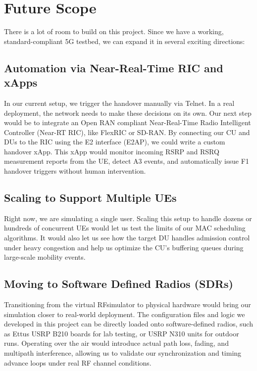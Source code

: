 \section{Future Scope}
\justify
There is a lot of room to build on this project. Since we have a working, standard-compliant 5G testbed, we can expand it in several exciting directions:

\subsection{Automation via Near-Real-Time RIC and xApps}
In our current setup, we trigger the handover manually via Telnet. In a real deployment, the network needs to make these decisions on its own. Our next step would be to integrate an Open RAN compliant Near-Real-Time Radio Intelligent Controller (Near-RT RIC), like FlexRIC or SD-RAN. By connecting our CU and DUs to the RIC using the E2 interface (E2AP), we could write a custom handover xApp. This xApp would monitor incoming RSRP and RSRQ measurement reports from the UE, detect A3 events, and automatically issue F1 handover triggers without human intervention.

\subsection{Scaling to Support Multiple UEs}
Right now, we are simulating a single user. Scaling this setup to handle dozens or hundreds of concurrent UEs would let us test the limits of our MAC scheduling algorithms. It would also let us see how the target DU handles admission control under heavy congestion and help us optimize the CU's buffering queues during large-scale mobility events.

\subsection{Moving to Software Defined Radios (SDRs)}
Transitioning from the virtual RFsimulator to physical hardware would bring our simulation closer to real-world deployment. The configuration files and logic we developed in this project can be directly loaded onto software-defined radios, such as Ettus USRP B210 boards for lab testing, or USRP N310 units for outdoor runs. Operating over the air would introduce actual path loss, fading, and multipath interference, allowing us to validate our synchronization and timing advance loops under real RF channel conditions.

